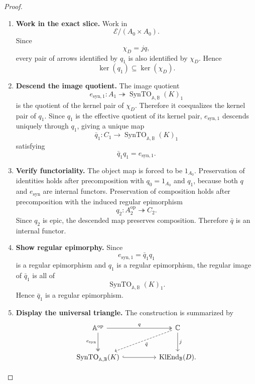 \begin{proof}
    \leavevmode
    \begin{enumerate}
        \item \textbf{Work in the exact slice.}
        Work in
        \[
            \mathcal E/(A_0\times A_0).
        \]
        Since
        \[
            \chi_D=jq,
        \]
        every pair of arrows identified by \(q_1\) is also identified by
        \(\chi_D\). Hence
        \[
            \ker(q_1)\subseteq\ker(\chi_D).
        \]

        \item \textbf{Descend the image quotient.}
        The image quotient
        \[
            e_{\mathrm{syn},1}:A_1\twoheadrightarrow
            \operatorname{SynTO}_{\mathbb A,\mathbb B}(K)_1
        \]
        is the quotient of the kernel pair of \(\chi_D\). Therefore it
        coequalizes the kernel pair of \(q_1\). Since \(q_1\) is the effective
        quotient of its kernel pair, \(e_{\mathrm{syn},1}\) descends uniquely
        through \(q_1\), giving a unique map
        \[
            \bar q_1:
            C_1\to
            \operatorname{SynTO}_{\mathbb A,\mathbb B}(K)_1
        \]
        satisfying
        \[
            \bar q_1q_1=e_{\mathrm{syn},1}.
        \]

        \item \textbf{Verify functoriality.}
        The object map is forced to be \(1_{A_0}\). Preservation of identities
        holds after precomposition with \(q_0=1_{A_0}\) and \(q_1\), because
        both \(q\) and \(e_{\mathrm{syn}}\) are internal functors. Preservation
        of composition holds after precomposition with the induced regular
        epimorphism
        \[
            q_2:A^{\mathrm{op}}_2\twoheadrightarrow C_2.
        \]
        Since \(q_2\) is epic, the descended map preserves composition.
        Therefore \(\bar q\) is an internal functor.

        \item \textbf{Show regular epimorphy.}
        Since
        \[
            e_{\mathrm{syn},1}=\bar q_1q_1
        \]
        is a regular epimorphism and \(q_1\) is a regular epimorphism, the
        regular image of \(\bar q_1\) is all of
        \[
            \operatorname{SynTO}_{\mathbb A,\mathbb B}(K)_1.
        \]
        Hence \(\bar q_1\) is a regular epimorphism.

        \item \textbf{Display the universal triangle.}
        The construction is summarized by
        \[
        \begin{tikzcd}[column sep=huge, row sep=large]
            \mathbb A^{\mathrm{op}}
                \arrow[r, two heads, "q"]
                \arrow[d, two heads, "e_{\mathrm{syn}}"']
            &
            \mathbb C
                \arrow[dl, dashed, "\bar q"]
                \arrow[d, "j"]
            \\
            \operatorname{SynTO}_{\mathbb A,\mathbb B}(K)
                \arrow[r, hook]
            &
            \operatorname{KlEnd}_{\mathbb B}(D).
        \end{tikzcd}
        \]
    \end{enumerate}
\end{proof}

